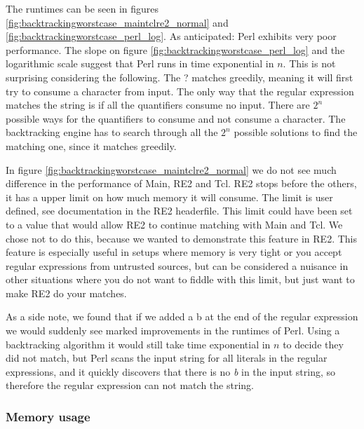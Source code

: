 The runtimes can be seen in figures
\ref{fig:backtrackingworstcase_maintclre2_normal} and
\ref{fig:backtrackingworstcase_perl_log}. As anticipated: Perl
exhibits very poor performance. The slope on figure
\vref{fig:backtrackingworstcase_perl_log} and the logarithmic scale
suggest that Perl runs in time exponential in $n$. This is not
surprising considering the following. The \textsf{?} matches greedily,
meaning it will first try to consume a character from input. The only
way that the regular expression matches the string is if all the
quantifiers consume no input. There are $2^n$ possible ways for the
quantifiers to consume and not consume a character. The backtracking
engine has to search through all the $2^n$ possible solutions to find
the matching one, since it matches greedily.

In figure \vref{fig:backtrackingworstcase_maintclre2_normal} we do not
see much difference in the performance of Main, RE2 and Tcl. RE2 stops
before the others, it has a upper limit on how much memory it will
consume. The limit is user defined, see documentation in the RE2
headerfile. This limit could have been set to a value that would allow
RE2 to continue matching with Main and Tcl. We chose not to do this,
because we wanted to demonstrate this feature in RE2. This feature is
especially useful in setups where memory is very tight or you accept
regular expressions from untrusted sources, but can be considered a
nuisance in other situations where you do not want to fiddle with this
limit, but just want to make RE2 do your matches.

As a side note, we found that if we added a \textsf{b} at the end of
the regular expression we would suddenly see marked improvements in
the runtimes of Perl. Using a backtracking algorithm it would still
take time exponential in $n$ to decide they did not match, but Perl
scans the input string for all literals in the regular expressions,
and it quickly discovers that there is no \textsl{b} in the input
string, so therefore the regular expression can not match the
string. 


\subsubsection{Memory usage}

